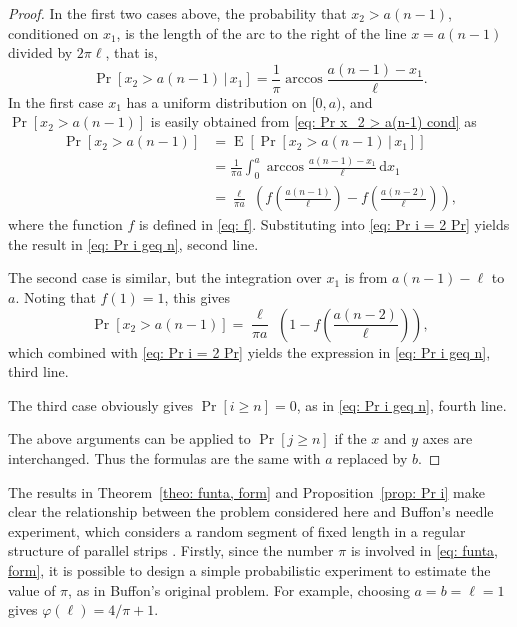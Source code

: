 \documentclass[12pt, a4paper]{article}
\newcommand{\cond}{\,|\,} %
\newcommand{\diff}{\mathrm d}
\DeclareMathOperator{\E}{E}
\newcommand{\funta}{\varphi} %
\newcommand{\len}{\ell} %
\begin{document}
\begin{proof}
In the first two cases above, the probability that $x_2 > a(n-1)$, conditioned on $x_1$, is the length of the arc to the right of the line $x=a(n-1)$ divided by $2\pi\len$, that is,
\begin{equation}
\label{eq: Pr x_2 > a(n-1) cond}
\Pr[x_2 > a(n-1) \cond x_1] = \frac 1 \pi \arccos \frac{a(n-1)-x_1}{\len}.
\end{equation}
In the first case $x_1$ has a uniform distribution on $[0,a)$, and $\Pr[x_2 > a(n-1)]$ is easily obtained from \eqref{eq: Pr x_2 > a(n-1) cond} as
\begin{equation}
\label{eq: Pr x_2 > a(n-1), first case}
\begin{split}
\Pr[x_2 > a(n-1)] &= \E[\Pr[x_2 > a(n-1) \cond x_1]] \\
&= \frac 1 {\pi a} \int_0^a\arccos \frac{a(n-1)-x_1}{\len} \, \diff x_1 \\
&= \frac{\len}{\pi a}\,\, \left( f\left( \frac{a(n-1)}{\len} \right) - f\left( \frac{a(n-2)}{\len} \right) \right),
\end{split}
\end{equation}
where the function $f$ is defined in \eqref{eq: f}. Substituting into \eqref{eq: Pr i = 2 Pr} yields the result in \eqref{eq: Pr i geq n}, second line.

The second case is similar, but the integration over $x_1$ is from $a(n-1)-\len$ to $a$. Noting that $f(1)=1$, this gives
\begin{equation}
\label{eq: Pr x_2 > a(n-1), second case}
\Pr[x_2 > a(n-1)] = \frac{\len}{\pi a}\,\, \left( 1 - f\left( \frac{a(n-2)}{\len} \right) \right),
\end{equation}
which combined with \eqref{eq: Pr i = 2 Pr} yields the expression in \eqref{eq: Pr i geq n}, third line.

The third case obviously gives $\Pr[i \geq n] = 0$, as in \eqref{eq: Pr i geq n}, fourth line.

The above arguments can be applied to $\Pr[j \geq n]$ if the $x$ and $y$ axes are interchanged. Thus the formulas are the same with $a$ replaced by $b$.
\end{proof}

The results in Theorem~\ref{theo: funta, form} and Proposition~\ref{prop: Pr i} make clear the relationship between the problem considered here and Buffon's needle experiment, which considers a random segment of fixed length in a regular structure of parallel strips \cite[section~1.1]{Mathai99}. Firstly, since the number $\pi$ is involved in \eqref{eq: funta, form}, it is possible to design a simple probabilistic experiment to estimate the value of $\pi$, as in Buffon's original problem. For example, choosing $a=b=\len=1$ gives $\funta(\len) = 4/\pi+1$.
\end{document}
